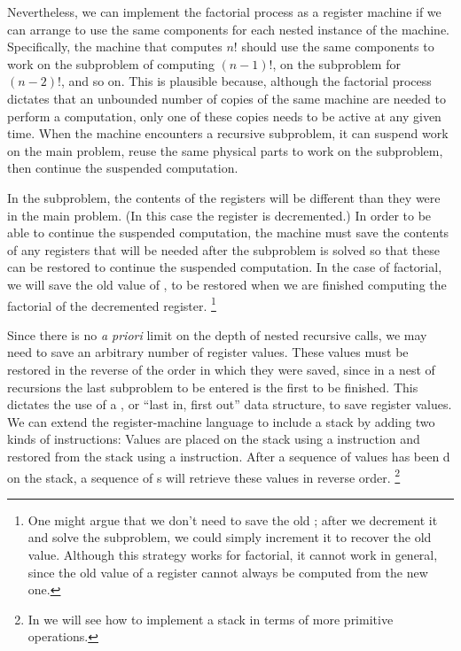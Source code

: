 Nevertheless, we can implement the factorial process as a register machine if we can arrange to use the same components for each nested instance of the machine.
Specifically, the machine that computes \( n! \)  should use the same components to work on the subproblem of computing \( (n - 1)! \), on the subproblem for \( (n - 2)! \), and so on.
This is plausible because, although the factorial process dictates that an unbounded number of copies of the same machine are needed to perform a computation, only one of these copies needs to be active at any given time.
When the machine encounters a recursive subproblem, it can suspend work on the main problem, reuse the same physical parts to work on the subproblem, then continue the suspended computation.

In the subproblem, the contents of the registers will be different than they were in the main problem.
(In this case the  register is decremented.)
In order to be able to continue the suspended computation, the machine must save the contents of any registers that will be needed after the subproblem is solved so that these can be restored to continue the suspended computation.
In the case of factorial, we will save the old value of , to be restored when we are finished computing the factorial of the decremented  register.%
\footnote{
	One might argue that we don’t need to save the old ;
	after we decrement it and solve the subproblem, we could simply increment it to recover the old value.
	Although this strategy works for factorial, it cannot work in general, since the old value of a register cannot always be computed from the new one.
}

Since there is no \emph{a priori} limit on the depth of nested recursive calls, we may need to save an arbitrary number of register values.
These values must be restored in the reverse of the order in which they were saved, since in a nest of recursions the last subproblem to be entered is the first to be finished.
This dictates the use of a , or “last in, first out” data structure, to save register values.
We can extend the register-machine language to include a stack by adding two kinds of instructions:
Values are placed on the stack using a  instruction and restored from the stack using a  instruction.
After a sequence of values has been d on the stack, a sequence of s will retrieve these values in reverse order.%
\footnote{
	In  we will see how to implement a stack in terms of more primitive operations.
}

